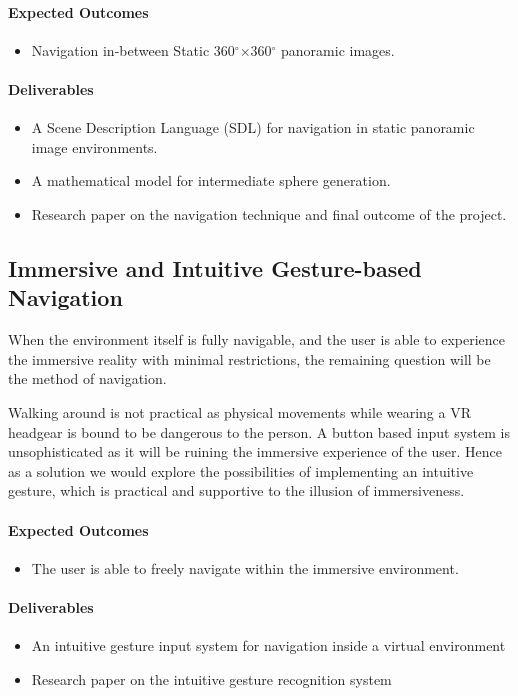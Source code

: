\paragraph{Expected Outcomes}
\begin{itemize}
\item{Navigation in-between Static 360$^{\circ}$$\times$360$^{\circ}$ panoramic images.}
\end{itemize}

\paragraph{Deliverables}
\begin{itemize}
\item{A Scene Description Language (SDL) for navigation in static panoramic image environments.}
\item{A mathematical model for intermediate sphere generation.}
\item{Research paper on the navigation technique and final outcome of the project.}
\end{itemize}

\subsection{Immersive and Intuitive Gesture-based Navigation}
\label{intro_subsec:3_4}

When the environment itself is fully navigable, and the user is able to experience the immersive reality with minimal restrictions, the remaining question will be the method of navigation.

Walking around is not practical as physical movements while wearing a VR headgear is bound to be dangerous to the person. A button based input system is unsophisticated as it will be ruining the immersive experience of the user. Hence as a solution we would explore the possibilities of implementing an intuitive gesture, which is practical and supportive to the illusion of immersiveness.

\paragraph{Expected Outcomes}
\begin{itemize}
\item{The user is able to freely navigate within the immersive environment.}
\end{itemize}

\paragraph{Deliverables}
\begin{itemize}
\item{An intuitive gesture input system for navigation inside a virtual environment}
\item{Research paper on the intuitive gesture recognition system}
\end{itemize}

